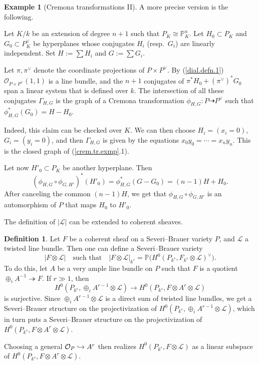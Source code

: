\documentclass{amsart}
\theoremstyle{definition}
\newtheorem{defn}[thm]{Definition}
\newtheorem{exmp}[thm]{Example}
\theoremstyle{remark}
\renewcommand{\o}[0]{{\mathcal O}}
\newcommand{\p}[0]{{\mathbb P}}
\newcommand{\map}[0]{\dasharrow}
\newcommand{\qtq}[1]{\quad\mbox{#1}\quad}
\newcommand{\onto}[0]{\twoheadrightarrow}
\def\into{\DOTSB\lhook\joinrel\to}
\begin{document}
\begin{exmp}[Cremona transformations II]\label{crem.tr.exmp.2}
  A more precise version is the following.

  Let $K/k$ be an extension of degree $n+1$ such that $P_K\cong \p^n_K$. 
  Let $H_0\subset P_K$  and $G_0\subset P_K^\vee$ be  hyperplanes whose conjugates  $H_i$  (resp.\ $G_i$) are linearly independent. Set   $H:=\sum H_i$  and $G:=\sum G_i$.

  Let $\pi,\pi^\vee$ denote the coordinate projections of $P\times P^\vee$. By (\ref{dial.defn.1})  $\o_{P\times P^\vee}(1,1)$ is a line bundle,
  and the $n+1$ conjugates of $\pi^*H_0+(\pi^\vee)^*G_0$ span a linear system that is defined over $k$. The intersection of all these conjugates  $\Gamma_{H,G}$
  is the graph of a Cremona transformation  $\phi_{H,G}:P\map P^\vee$ such that
  $\phi_{H,G}^*(G_0)=H-H_0$.

  Indeed, this claim can be checked over $K$. We can then choose
  $H_i=(x_i=0)$, $G_i=(y_i=0)$, and then $\Gamma_{H,G}$
  is given by the equations
  $x_0y_0=\cdots=x_ny_n$.  This is the closed graph of (\ref{crem.tr.exmp}.1).

  Let now $H'_0\subset P_K$ be another hyperplane. Then
  $$
  (\phi_{H,G}\circ \phi_{G,H'})^*(H'_0)=\phi_{H,G}^*(G-G_0)=(n-1)H+H_0.
  $$
  After canceling the common $(n-1)H$, we get that
  $\phi_{H,G}\circ \phi_{G,H'}$ is an automorphism of $P$ that maps
  $H_0$ to $H'_0$.
  \end{exmp}



The definition of $ |{\mathcal L}|$ can be extended to coherent sheaves.

\begin{defn}\label{|F|.defn} Let $F$ be a coherent sheaf on a Severi--Brauer variety $P$, and
  ${\mathcal L}$ a twisted line bundle. Then one can define a
  Severi--Brauer variety
  $$
  |F\otimes \mathcal L|\qtq{such that}
  |F\otimes \mathcal L|_{k^s}=\p\bigl(H^0(P_{k^s}, F_{k^s}\otimes \mathcal L)^\vee\bigr).
  $$
  To do this, let  $A$ be a very ample line bundle on $P$ such that
  $F$ is a quotient  $\oplus_i A^{-1}\onto F$. If $r\gg 1$, then
  $$
  H^0(P_{k^s}, \oplus_i A^{r-1}\otimes \mathcal L)\to H^0(P_{k^s}, F\otimes A^r\otimes\mathcal L)
  $$
  is surjective.
  Since  $ \oplus_i A^{r-1}\otimes \mathcal L$ is a direct sum of twisted line bundles, we get a Severi--Brauer structure on the
  projectivization of $H^0(P_{k^s}, \oplus_i A^{r-1}\otimes \mathcal L)$, which in turn puts a 
Severi--Brauer structure on
the projectivization of $H^0(P_{k^s}, F\otimes A^r\otimes\mathcal L) $.

Choosing a general  $\o_P\into A^r$ then realizes
$H^0(P_{k^s}, F\otimes\mathcal L)$ as a
linear subspace of  $H^0(P_{k^s}, F\otimes A^r\otimes\mathcal L)$.
\end{defn}
\end{document}
